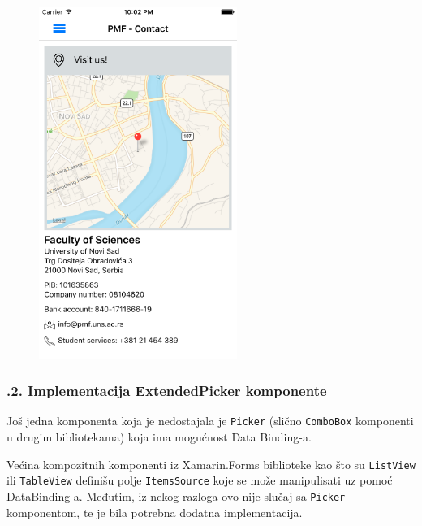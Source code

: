 \documentclass[a4paper]{article}
\begin{document}
\subsubsection[]{\rmfamily }
\begin{figure}
\centering
\includegraphics[width=64.49mm,height=114.72mm]{msc-img60.png}
\end{figure}
\clearpage\subsubsection[7.8.2. Implementacija ExtendedPicker
komponente]{.2. Implementacija ExtendedPicker komponente}
\hypertarget{RefHeadingToc864882405265}{}Još jedna komponenta koja je
nedostajala je \texttt{\textcolor[rgb]{0.0,0.4,0.8}{Picker}} (slično
\texttt{\textcolor[rgb]{0.0,0.4,0.8}{ComboBox}} komponenti u drugim
bibliotekama) koja ima mogućnost Data Binding-a.

Većina kompozitnih komponenti iz Xamarin.Forms biblioteke kao što su
\texttt{\textcolor[rgb]{0.0,0.4,0.8}{ListView}} ili
\texttt{\textcolor[rgb]{0.0,0.4,0.8}{TableView}} definišu polje
\texttt{\textcolor[rgb]{0.0,0.4,0.8}{ItemsSource}} koje se može
manipulisati uz pomoć DataBinding-a. Međutim, iz nekog razloga ovo nije
slučaj sa \texttt{\textcolor[rgb]{0.0,0.4,0.8}{Picker}} komponentom, te
je bila potrebna dodatna implementacija.
\end{document}
